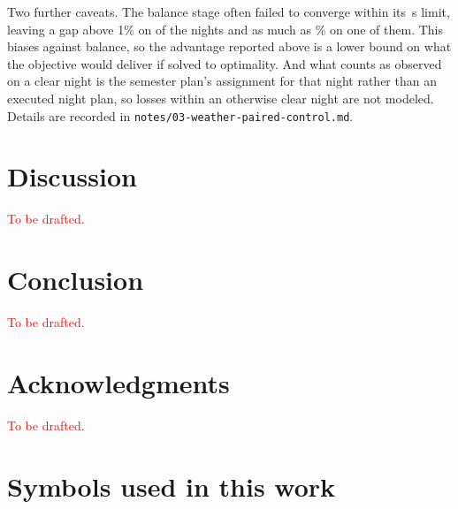 \documentclass[twocolumn,linenumbers]{aastex63}
\newcommand{\red}[1]{\textcolor{red}{#1}}
\begin{document}
Two further caveats. The balance stage often failed to converge within its
\,s limit, leaving a gap above 1\% on
 of the  nights and as much as
\% on one of them. This biases against balance, so
the advantage reported above is a lower bound on what the objective would
deliver if solved to optimality. And what counts as observed on a clear night is the semester plan's
assignment for that night rather than an executed night plan, so losses within
an otherwise clear night are not modeled. Details are recorded in
\texttt{notes/03-weather-paired-control.md}.

\section{Discussion}
\label{sec:discussion}

\red{To be drafted.}

\section{Conclusion}
\label{sec:conclusion}

\red{To be drafted.}

\section{Acknowledgments}

\red{To be drafted.}

\appendix

\section{Symbols used in this work}



\end{document}
